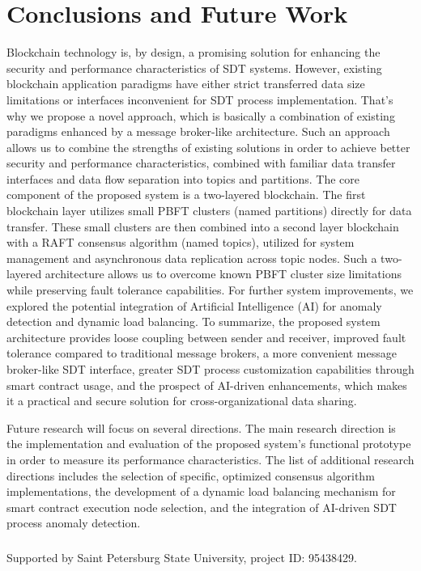 \documentclass[10pt]{llncs}
\begin{document}
\section{Conclusions and Future Work} \label{summary}

Blockchain technology is, by design, a promising solution for enhancing the security and performance characteristics of SDT systems.
However, existing blockchain application paradigms have either strict transferred data size limitations or interfaces inconvenient for SDT process implementation.
That's why we propose a novel approach, which is basically a combination of existing paradigms enhanced by a message broker-like architecture.
Such an approach allows us to combine the strengths of existing solutions in order to achieve better security and performance characteristics, combined with familiar data transfer interfaces
and data flow separation into topics and partitions.
The core component of the proposed system is a two-layered blockchain. 
The first blockchain layer utilizes small PBFT clusters (named partitions) directly for data transfer. 
These small clusters are then combined into a second layer blockchain with a RAFT consensus algorithm (named topics), utilized for system management and asynchronous data replication across topic nodes.
Such a two-layered architecture allows us to overcome known PBFT cluster size limitations while preserving fault tolerance capabilities.
For further system improvements, we explored the potential integration of Artificial Intelligence (AI) for anomaly detection and dynamic load balancing.
To summarize, the proposed system architecture provides loose coupling between sender and receiver, improved fault tolerance compared to traditional message brokers, 
a more convenient message broker-like SDT interface, greater SDT process customization capabilities through smart contract usage, and the prospect of AI-driven enhancements, 
which makes it a practical and secure solution for cross-organizational data sharing.

Future research will focus on several directions. 
The main research direction is the implementation and evaluation of the proposed system's functional prototype in order to measure its performance characteristics. 
The list of additional research directions includes the selection of specific, optimized consensus algorithm implementations, the development of a dynamic load balancing mechanism 
for smart contract execution node selection, and the integration of AI-driven SDT process anomaly detection.

\begin{credits}
    \subsubsection{\ackname} Supported by Saint Petersburg State University, project ID: 95438429.
\end{credits}


\end{document}
